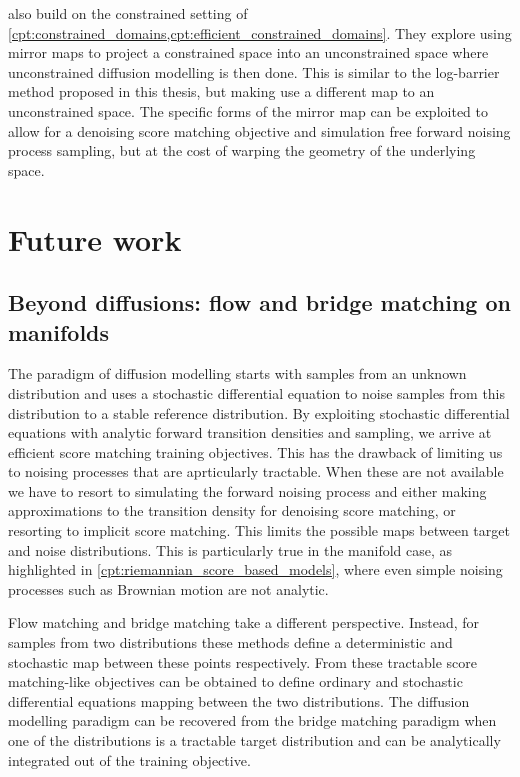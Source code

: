 \textcite{tae2023mirror, liu2024mirror} also build on the constrained setting of \cref{cpt:constrained_domains,cpt:efficient_constrained_domains}. They explore using mirror maps to project a constrained space into an unconstrained space where unconstrained diffusion modelling is then done. 
This is similar to the log-barrier method proposed in this thesis, but making use a different map to an unconstrained space.
The specific forms of the mirror map can be exploited to allow for a denoising score matching objective and simulation free forward noising process sampling, but at the cost of warping the geometry of the underlying space.

\section{Future work}

\subsection{Beyond diffusions: flow and bridge matching on manifolds}

The paradigm of diffusion modelling starts with samples from an unknown distribution and uses a stochastic differential equation to noise samples from this distribution to a stable reference distribution.
By exploiting stochastic differential equations with analytic forward transition densities and sampling, we arrive at efficient score matching training objectives.
This has the drawback of limiting us to noising processes that are aprticularly tractable.
When these are not available we have to resort to simulating the forward noising process and either making approximations to the transition density for denoising score matching, or resorting to implicit score matching.
This limits the possible maps between target and noise distributions.
This is particularly true in the manifold case, as highlighted in \cref{cpt:riemannian_score_based_models}, where even simple noising processes such as Brownian motion are not analytic.

Flow matching \cite{lipman2022flow,liu2022rectified,albergo2023stochastic} and bridge matching \cite{peluchetti2023non,liu2022let,albergo2023stochastic} take a different perspective.
Instead, for samples from two distributions these methods define a deterministic and stochastic map between these points respectively. 
From these tractable score matching-like objectives can be obtained to define ordinary and stochastic differential equations mapping between the two distributions.
The diffusion modelling paradigm can be recovered from the bridge matching paradigm when one of the distributions is a tractable target distribution and can be analytically integrated out of the training objective.

